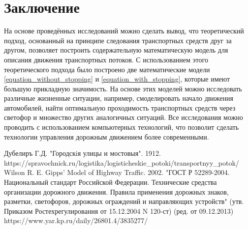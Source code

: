 \documentclass[12pt, a4paper]{extarticle}
\numberwithin{equation}{section}
\begin{document}
\section*{Заключение}
На основе проведённых исследований можно сделать вывод, что теоретический подход, основанный на принципе следования транспортных средств друг за другом, позволяет построить содержательную математическую модель для описания движения транспортных потоков. С использованием этого теоретического подхода было построено две математические модели  \eqref{equation_without_stopping} и \eqref{equation_with_stopping}, которые имеют большую прикладную значимость. На основе этих моделей можно исследовать различные жизненные ситуации, например, смоделировать начало движения автомобилей, найти оптимальную проходимость транспортных средств через светофор и множество других аналогичных ситуаций. Все исследования можно проводить с использованием компьютерных технологий, что позволит сделать технологии управления дорожным движением более современными.

\newpage

\begin{thebibliography}{**}
	Дубелиръ Г.Д. "Городскiя улицы и мостовыя". 1912.
	https://spravochnick.ru/logistika/logisticheskie\_potoki/transportnyy\_potok/
	Wilson R. E. Gipps’ Model of Highway Traffic. 2002.
	"ГОСТ Р 52289-2004. Национальный стандарт Российской Федерации. Технические средства организации дорожного движения. Правила применения дорожных знаков, разметки, светофоров, дорожных ограждений и направляющих устройств" (утв. Приказом Ростехрегулирования от 15.12.2004 N 120-ст) (ред. от 09.12.2013)
	https://www.yar.kp.ru/daily/26801.4/3835277/
\end{thebibliography}
\end{document}
